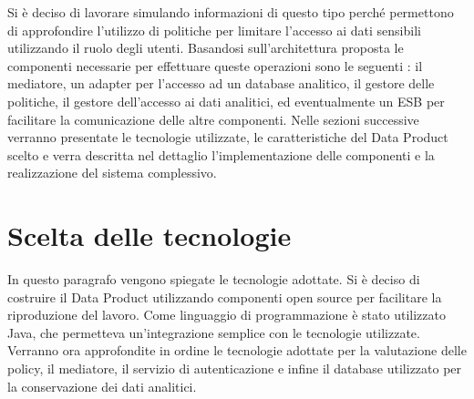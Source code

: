 \documentclass[12pt]{report}
\begin{document}
Si è deciso di lavorare simulando informazioni di questo tipo perché permettono di approfondire l'utilizzo di politiche per limitare l'accesso ai dati sensibili utilizzando il ruolo degli utenti.
Basandosi sull'architettura proposta le componenti necessarie per effettuare queste operazioni sono le seguenti : il mediatore, un adapter per l'accesso ad un database analitico, il gestore delle politiche, il gestore dell'accesso ai dati analitici, ed eventualmente un ESB per facilitare la comunicazione delle altre componenti.
Nelle sezioni successive verranno presentate le tecnologie utilizzate, le caratteristiche del Data Product scelto e  verra descritta nel dettaglio l'implementazione delle componenti e la realizzazione del sistema complessivo.

\section{Scelta delle tecnologie}
In questo paragrafo vengono spiegate le tecnologie adottate.
Si è deciso di costruire il Data Product utilizzando componenti open source per facilitare la riproduzione del lavoro.
Come linguaggio di programmazione è stato utilizzato Java, che permetteva un'integrazione semplice con le tecnologie utilizzate.
Verranno ora approfondite in ordine le tecnologie adottate per la valutazione delle policy, il mediatore, il servizio di autenticazione e infine il database utilizzato per la conservazione dei dati analitici.
\end{document}
